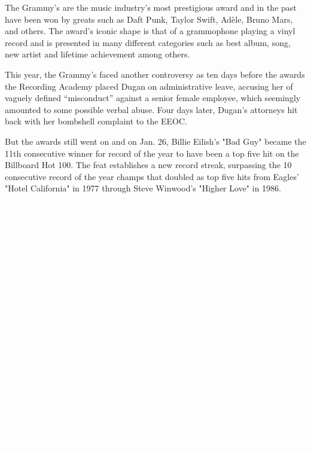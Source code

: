 \documentclass{article}
\begin{document}
\begin{multicols}{2}


The Grammy's are the music industry's most prestigious award and in the past have been won by greats such as Daft Punk, Taylor Swift, Adèle, Bruno Mars, and others. The award's iconic shape is that of a grammophone playing a vinyl record and is presented in many different categories such as best album, song, new artist and lifetime achievement among others.

This year, the Grammy's faced another controversy as ten days before the awards the Recording Academy placed Dugan on administrative leave, accusing her of vaguely defined “misconduct” against a senior female employee, which seemingly amounted to some possible verbal abuse. Four days later, Dugan’s attorneys hit back with her bombshell complaint to the EEOC.

But the awards still went on and on Jan. 26, Billie Eilish's "Bad Guy" became the 11th consecutive winner for record of the year to have been a top five hit on the Billboard Hot 100. The feat establishes a new record streak, surpassing the 10 consecutive record of the year champs that doubled as top five hits from Eagles' "Hotel California" in 1977 through Steve Winwood's "Higher Love" in 1986.


\vfill
\includegraphics[scale=0.1]{w}


\end{multicols}
\end{document}
